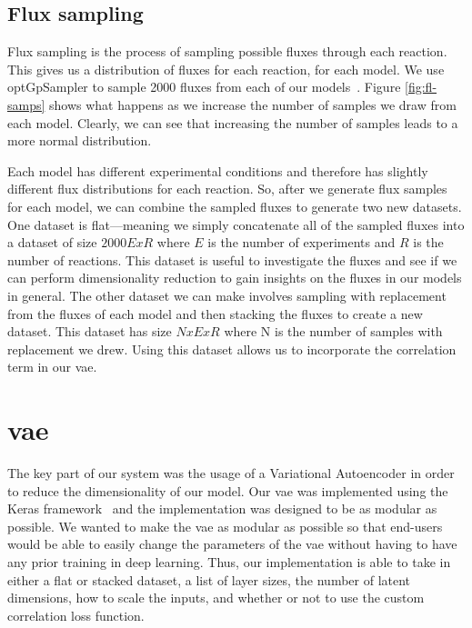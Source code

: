 \subsection{Flux sampling}
Flux sampling is the process of sampling possible fluxes through each reaction.
This gives us a distribution of fluxes for each reaction, for each model.
We use optGpSampler to sample 2000 fluxes from each of our models~\cite{megchelenbrink2014optgpsampler}.
Figure \ref{fig:fl-samps} shows what happens as we increase the number of samples we draw from each model.
Clearly, we can see that increasing the number of samples leads to a more normal distribution.


Each model has different experimental conditions and therefore has slightly different flux distributions for each reaction.
So, after we generate flux samples for each model, we can combine the sampled fluxes to generate two new datasets.
One dataset is flat---meaning we simply concatenate all of the sampled fluxes into a dataset of size $2000E x R$ where $E$ is the number of experiments and $R$ is the number of reactions.
This dataset is useful to investigate the fluxes and see if we can perform dimensionality reduction to gain insights on the fluxes in our models in general.
The other dataset we can make involves sampling with replacement from the fluxes of each model and then stacking the fluxes to create a new dataset.
This dataset has size $N x E x R$ where N is the number of samples with replacement we drew.
Using this dataset allows us to incorporate the correlation term in our \gls{vae}.

\section{\gls{vae}}
The key part of our system was the usage of a Variational Autoencoder in order to reduce the dimensionality of our model.
Our \gls{vae} was implemented using the Keras framework~\cite{chollet2015keras} and the implementation was designed to be as modular as possible.
We wanted to make the \gls{vae} as modular as possible so that end-users would be able to easily change the parameters of the \gls{vae} without having to have any prior training in deep learning.
Thus, our implementation is able to take in either a flat or stacked dataset, a list of layer sizes, the number of latent dimensions, how to scale the inputs, and whether or not to use the custom correlation loss function.

